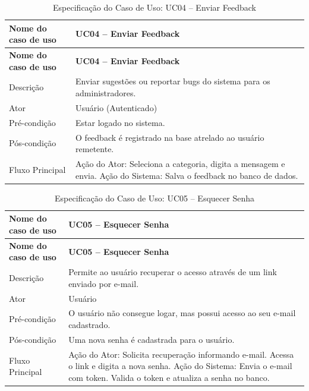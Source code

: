 \fonteautores

\vspace{\baselineskip}

\Needspace{0.48\textheight}
\begin{longtable}{|L{4.5cm}|L{10.5cm}|}
\caption{Especificação do Caso de Uso: UC04 -- Enviar Feedback} \\
\hline
\textbf{Nome do caso de uso} & \textbf{UC04 -- Enviar Feedback} \\
\hline
\endfirsthead
\hline
\textbf{Nome do caso de uso} & \textbf{UC04 -- Enviar Feedback} \\
\hline
\endhead
Descrição       & Enviar sugestões ou reportar bugs do sistema para os administradores. \\
\hline
Ator            & Usuário (Autenticado) \\
\hline
Pré-condição    & Estar logado no sistema. \\
\hline
Pós-condição    & O feedback é registrado na base atrelado ao usuário remetente. \\
\hline
Fluxo Principal & Ação do Ator: Seleciona a categoria, digita a mensagem e envia. Ação do Sistema: Salva o feedback no banco de dados. \\
\hline
\end{longtable}

\fonteautores

\vspace{\baselineskip}

\Needspace{0.48\textheight}
\begin{longtable}{|L{4.5cm}|L{10.5cm}|}
\caption{Especificação do Caso de Uso: UC05 -- Esquecer Senha} \\
\hline
\textbf{Nome do caso de uso} & \textbf{UC05 -- Esquecer Senha} \\
\hline
\endfirsthead
\hline
\textbf{Nome do caso de uso} & \textbf{UC05 -- Esquecer Senha} \\
\hline
\endhead
Descrição       & Permite ao usuário recuperar o acesso através de um link enviado por e-mail. \\
\hline
Ator            & Usuário \\
\hline
Pré-condição    & O usuário não consegue logar, mas possui acesso ao seu e-mail cadastrado. \\
\hline
Pós-condição    & Uma nova senha é cadastrada para o usuário. \\
\hline
Fluxo Principal & Ação do Ator: Solicita recuperação informando e-mail. Acessa o link e digita a nova senha. Ação do Sistema: Envia o e-mail com token. Valida o token e atualiza a senha no banco. \\
\hline
\end{longtable}

